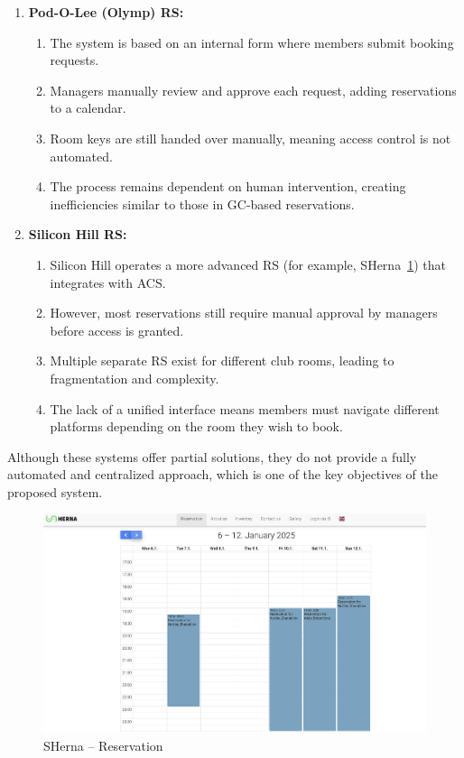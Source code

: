 \begin{enumerate}
  \item \textbf{Pod-O-Lee (Olymp) RS:}
    \begin{enumerate}
      \item The system is based on an internal form where members submit booking requests.
      \item Managers manually review and approve each request, adding reservations to a calendar.
      \item Room keys are still handed over manually, meaning access control is not automated.
      \item The process remains dependent on human intervention, creating inefficiencies similar to those in GC-based reservations.
    \end{enumerate}
  \item \textbf{Silicon Hill RS:}
    \begin{enumerate}
      \item Silicon Hill operates a more advanced RS (for example, SHerna~\ref{fig:SHerna}) that integrates with ACS.
      \item However, most reservations still require manual approval by managers before access is granted.
      \item Multiple separate RS exist for different club rooms, leading to fragmentation and complexity.
      \item The lack of a unified interface means members must navigate different platforms depending on the room they wish to book.
    \end{enumerate}
\end{enumerate}

Although these systems offer partial solutions, they do not provide a fully automated and centralized approach, which is one of the key objectives of the proposed system.

\begin{figure}[!htbp]
  \centering
  \includegraphics[width=\linewidth]{images/sherna}
  \caption{SHerna -- Reservation~\cite{SHerna}}
  \label{fig:SHerna}
\end{figure}

